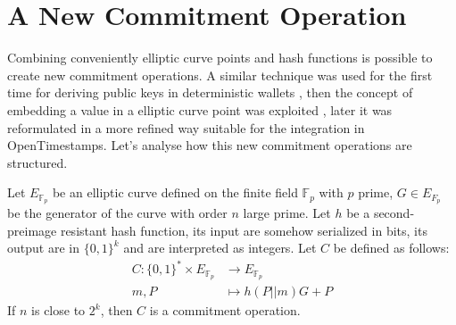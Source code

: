 \section{A New Commitment Operation}

Combining conveniently elliptic curve points and hash functions is possible to create new commitment operations.
A similar technique was used for the first time for deriving public keys in deterministic wallets \cite{Max11},
then the concept of embedding a value in a elliptic curve point was exploited \cite{journals/corr/abs-1212-3257, Sidechain},
later it was reformulated in a more refined way \cite{PoePR, PoeIs}
suitable for the integration in OpenTimestamps.
Let's analyse how this new commitment operations are structured.

\begin{myprop}
	Let $E_{\mathbb{F}_p}$ be an elliptic curve defined on the finite field $\mathbb{F}_p$ with $p$ prime, $G \in E_{F_p}$ be the generator of the curve with order $n$ large prime. Let $h$ be a second-preimage resistant hash function, its input are somehow serialized in bits, its output are in $\{0,1\}^k$ and are interpreted as integers.
	Let $C$ be defined as follows:
	\begin{equation}
	\begin{split}
	C : \{0,1\}^* \times E_{\mathbb{F}_p}  & \rightarrow E_{\mathbb{F}_p} \\
	    m, P & \mapsto h(P||m)G + P
	\end{split}
	\end{equation}
	If $n$ is close to $2^k$, then $C$ is a commitment operation.
\end{myprop}
